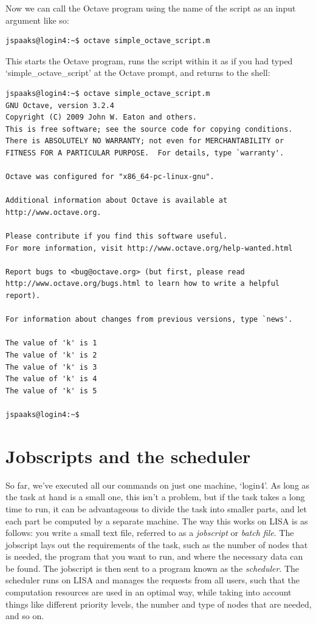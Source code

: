 Now we can call the Octave program using the name of the script as an input argument like so:
\begin{lstlisting}[style=basic,style=bash]
jspaaks@login4:~$ octave simple_octave_script.m 
\end{lstlisting}
This starts the Octave program, runs the script within it as if you had typed `simple\_octave\_script' at the Octave prompt, and returns to the shell:
\begin{lstlisting}[style=basic,style=bash]
jspaaks@login4:~$ octave simple_octave_script.m 
GNU Octave, version 3.2.4
Copyright (C) 2009 John W. Eaton and others.
This is free software; see the source code for copying conditions.
There is ABSOLUTELY NO WARRANTY; not even for MERCHANTABILITY or
FITNESS FOR A PARTICULAR PURPOSE.  For details, type `warranty'.

Octave was configured for "x86_64-pc-linux-gnu".

Additional information about Octave is available at http://www.octave.org.

Please contribute if you find this software useful.
For more information, visit http://www.octave.org/help-wanted.html

Report bugs to <bug@octave.org> (but first, please read
http://www.octave.org/bugs.html to learn how to write a helpful report).

For information about changes from previous versions, type `news'.

The value of 'k' is 1
The value of 'k' is 2
The value of 'k' is 3
The value of 'k' is 4
The value of 'k' is 5

jspaaks@login4:~$ 
\end{lstlisting}

\section{Jobscripts and the scheduler}

So far, we've executed all our commands on just one machine, `login4'. As long as the task at hand is a small one, this isn't a problem, but if the task takes a long time to run, it can be advantageous to divide the task into smaller parts, and let each part be computed by a separate machine. The way this works on LISA is as follows: you write a small text file, referred to as a  \textit{jobscript} or \textit{batch file}. The jobscript lays out the requirements of the task,  such as the number of nodes that is needed, the program that you want to run, and where the necessary data can be found. The jobscript is then sent to a program known as the \textit{scheduler}. The scheduler runs on LISA and manages the requests from all users, such that the computation resources are used in an optimal way, while taking into account things like different priority levels, the number and type of nodes that are needed, and so on. 

